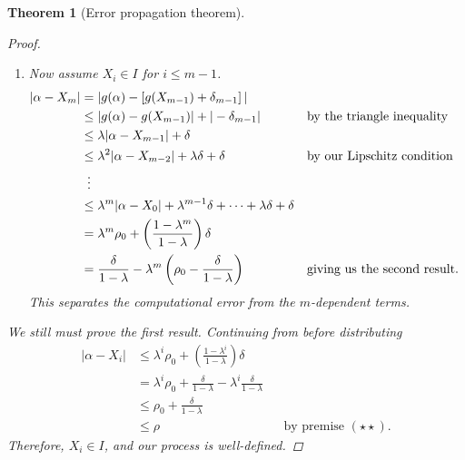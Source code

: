 \documentclass[12pt,letterpaper,DIV=11]{scrartcl}
\theoremstyle{plain}
\newtheorem{theorem}{Theorem}[section]
\theoremstyle{definition}
\theoremstyle{remark}
\begin{document}
\begin{theorem}[Error propagation theorem]
\begin{proof}
\begin{enumerate}
      \item Now assume $X_i \in I$ for $i \leq m - 1$.
        \begin{align*}
          |\alpha - X_m| &= |g(\alpha) - \left[ g(X_{m - 1}) + \delta_{m - 1} \right]| \\
                         &\leq |g(\alpha) - g(X_{m - 1})| + |-\delta_{m - 1}| && \text{by the triangle inequality} \\
                         &\leq \lambda |\alpha - X_{m - 1}| + \delta \\
                         &\leq \lambda^2 |\alpha - X_{m - 2}| + \lambda \delta  + \delta && \text{by our Lipschitz condition} \\
                         &\vdotswithin{\leq} \\
                         &\leq \lambda^m |\alpha - X_0| + \lambda^{m - 1} \delta + \cdots + \lambda \delta + \delta \\
                         &= \lambda^m \rho_0 + \left( \frac{1 - \lambda^m}{1 - \lambda} \right) \delta \\
                         &= \frac{\delta}{1 - \lambda} - \lambda^m \left( \rho_0 - \frac{\delta}{1 - \lambda} \right) && \text{giving us the second result}.
        \end{align*}
        This separates the computational error from the $m$-dependent terms.
    \end{enumerate}
    We still must prove the first result.
    Continuing from before distributing \begin{align*}
      |\alpha - X_i| &\leq \lambda^i \rho_0 + \left( \frac{1 - \lambda^i}{1 - \lambda} \right) \delta \\
                     &= \lambda^i \rho_0 + \frac{\delta}{1 - \lambda} - \lambda^i \frac{\delta}{1 - \lambda} \\
                     &\leq \rho_0 + \frac{\delta}{1 - \lambda} \\
                     &\leq \rho && \text{by premise $(\star\star)$.}
    \end{align*}
    Therefore, $X_i \in I$, and our process is well-defined.
  \end{proof}
\end{theorem}
\end{document}
